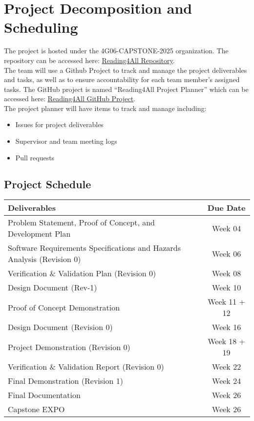 \documentclass{article}
\begin{document}
\section{Project Decomposition and Scheduling}

The project is hosted under the 4G06-CAPSTONE-2025 organization. The repository can be 
accessed here: \href{https://github.com/4G06-CAPSTONE-2025/Reading4All}{Reading4All Repository}. \\[1ex]
The team will use a Github Project to track and manage the project deliverables and tasks, as well 
as to ensure accountability for each team member's assigned tasks. The GitHub 
project is named ``Reading4All Project Planner'' which can be accessed here: 
\href{https://github.com/orgs/4G06-CAPSTONE-2025/projects/4}{Reading4All GitHub Project}. \\[1ex]
The project planner will have items to track and manage including:
\begin{itemize}
  \item Issues for project deliverables
  \item Supervisor and team meeting logs 
  \item Pull requests 
\end{itemize}
\subsection{Project Schedule}
\begin{center}
  \begin{tabularx}{\textwidth}{Xc}
    \toprule
    \textbf{Deliverables} & \textbf{Due Date} \\
    \midrule
    Problem Statement, Proof of Concept, and Development Plan & Week  04 \\
    Software Requirements Specifications and Hazards Analysis (Revision 0) & Week 06 \\
    Verification \& Validation Plan (Revision 0) & Week 08 \\
    Design Document (Rev-1) & Week 10 \\
    Proof of Concept Demonstration & Week 11 + 12 \\
    Design Document (Revision 0) & Week 16 \\
    Project Demonstration (Revision 0) & Week 18 + 19 \\
    Verification \& Validation Report (Revision 0) & Week 22 \\
    Final Demonstration (Revision 1) & Week 24 \\
    Final Documentation & Week 26 \\
    Capstone EXPO & Week 26 \\
    \bottomrule
  \end{tabularx}
\end{center}
\end{document}

